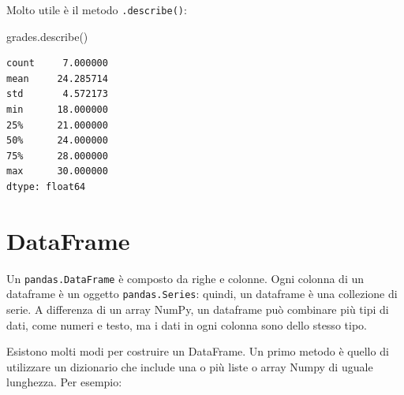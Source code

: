 \documentclass[
  letterpaper,
  krantz2]{{[}./krantz{]}}
\newenvironment{Shaded}{\begin{snugshade}}{\end{snugshade}}
\newcommand{\NormalTok}[1]{\textcolor[rgb]{0.00,0.23,0.31}{#1}}
\begin{document}
Molto utile è il metodo \texttt{.describe()}:

\begin{Shaded}
\begin{Highlighting}[]
\NormalTok{grades.describe()}
\end{Highlighting}
\end{Shaded}

\begin{verbatim}
count     7.000000
mean     24.285714
std       4.572173
min      18.000000
25%      21.000000
50%      24.000000
75%      28.000000
max      30.000000
dtype: float64
\end{verbatim}

\section{DataFrame}\label{dataframe}

Un \texttt{pandas.DataFrame} è composto da righe e colonne. Ogni colonna
di un dataframe è un oggetto \texttt{pandas.Series}: quindi, un
dataframe è una collezione di serie. A differenza di un array NumPy, un
dataframe può combinare più tipi di dati, come numeri e testo, ma i dati
in ogni colonna sono dello stesso tipo.

Esistono molti modi per costruire un DataFrame. Un primo metodo è quello
di utilizzare un dizionario che include una o più liste o array Numpy di
uguale lunghezza. Per esempio:
\end{document}
